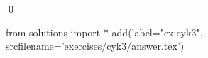 
\begin{ex} 
  \label{ex:cyk3}
  
  \qed
\end{ex} 
\begin{python0}
from solutions import *
add(label="ex:cyk3",
    srcfilename='exercises/cyk3/answer.tex') 
\end{python0}
